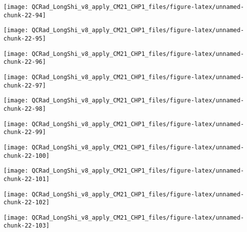 \documentclass[
  10pt,
  a4paper,oneside]{article}
\begin{document}
\begin{center}\texttt{[image: QCRad\_LongShi\_v8\_apply\_CM21\_CHP1\_files/figure-latex/unnamed-chunk-22-94]} \end{center}

\begin{center}\texttt{[image: QCRad\_LongShi\_v8\_apply\_CM21\_CHP1\_files/figure-latex/unnamed-chunk-22-95]} \end{center}

\begin{center}\texttt{[image: QCRad\_LongShi\_v8\_apply\_CM21\_CHP1\_files/figure-latex/unnamed-chunk-22-96]} \end{center}

\begin{center}\texttt{[image: QCRad\_LongShi\_v8\_apply\_CM21\_CHP1\_files/figure-latex/unnamed-chunk-22-97]} \end{center}

\begin{center}\texttt{[image: QCRad\_LongShi\_v8\_apply\_CM21\_CHP1\_files/figure-latex/unnamed-chunk-22-98]} \end{center}

\begin{center}\texttt{[image: QCRad\_LongShi\_v8\_apply\_CM21\_CHP1\_files/figure-latex/unnamed-chunk-22-99]} \end{center}

\begin{center}\texttt{[image: QCRad\_LongShi\_v8\_apply\_CM21\_CHP1\_files/figure-latex/unnamed-chunk-22-100]} \end{center}

\begin{center}\texttt{[image: QCRad\_LongShi\_v8\_apply\_CM21\_CHP1\_files/figure-latex/unnamed-chunk-22-101]} \end{center}

\begin{center}\texttt{[image: QCRad\_LongShi\_v8\_apply\_CM21\_CHP1\_files/figure-latex/unnamed-chunk-22-102]} \end{center}

\begin{center}\texttt{[image: QCRad\_LongShi\_v8\_apply\_CM21\_CHP1\_files/figure-latex/unnamed-chunk-22-103]} \end{center}
\end{document}
